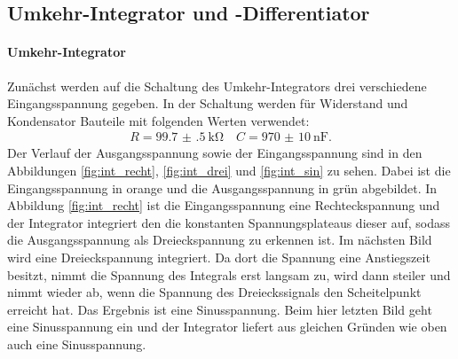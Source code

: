\subsection{Umkehr-Integrator und -Differentiator}

\paragraph{Umkehr-Integrator}

Zunächst werden auf die Schaltung des Umkehr-Integrators drei verschiedene Eingangsspannung gegeben.
In der Schaltung werden für Widerstand und Kondensator Bauteile mit folgenden  Werten verwendet:
\begin{align*}
  R = \SI{99.7(5)}{\kilo\ohm} \quad C = \SI{970(10)}{\nano\farad}.
\end{align*}
Der Verlauf der Ausgangsspannung sowie der Eingangsspannung sind in den Abbildungen \ref{fig:int_recht}, \ref{fig:int_drei} und \ref{fig:int_sin} zu sehen. Dabei ist die Eingangsspannung in orange und die Ausgangsspannung in grün abgebildet. In Abbildung \ref{fig:int_recht} ist die Eingangsspannung eine Rechteckspannung und der Integrator integriert den die konstanten Spannungsplateaus dieser auf, sodass die Ausgangsspannung als Dreieckspannung zu erkennen ist. Im nächsten Bild wird eine Dreieckspannung integriert. Da dort die Spannung eine Anstiegszeit besitzt, nimmt die Spannung des Integrals erst langsam zu, wird dann steiler und nimmt wieder ab, wenn die Spannung des Dreieckssignals den Scheitelpunkt erreicht hat. Das Ergebnis ist eine Sinusspannung. Beim hier letzten Bild geht eine Sinusspannung ein und der Integrator liefert aus gleichen Gründen wie oben auch eine Sinusspannung.


